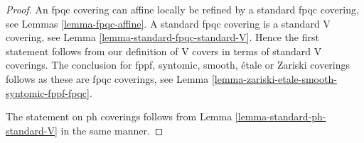 \documentclass[10pt,a4paper]{amsart}
\theoremstyle{plain}
\theoremstyle{definition}
\theoremstyle{remark}
\numberwithin{equation}{subsection}
\begin{document}
\begin{proof}
An fpqc covering can affine locally be refined by a
standard fpqc covering, see Lemmas \ref{lemma-fpqc-affine}.
A standard fpqc covering is a standard V covering, see
Lemma \ref{lemma-standard-fpqc-standard-V}. Hence the first statement
follows from our definition of V covers in terms of standard V coverings.
The conclusion for fppf, syntomic, smooth, \'etale or Zariski coverings
follows as these are fpqc coverings, see
Lemma \ref{lemma-zariski-etale-smooth-syntomic-fppf-fpqc}.

\medskip\noindent
The statement on ph coverings follows from
Lemma \ref{lemma-standard-ph-standard-V} in the same manner.
\end{proof}
\end{document}
